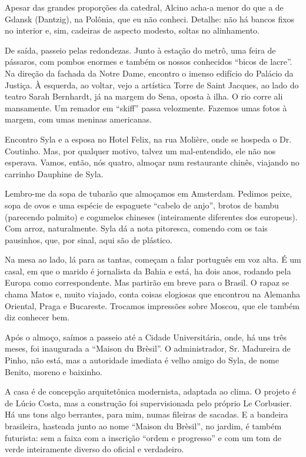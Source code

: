 Apesar das grandes proporções da catedral, Alcino acha-a menor do que a de Gdansk (Dantzig), na Polônia, que eu não conheci. Detalhe: não há bancos fixos no interior e, sim, cadeiras de aspecto modesto, soltas no alinhamento.

De saída, passeio pelas redondezas. Junto à estação do metrô, uma feira de pássaros, com pombos enormes e também os nossos conhecidos ``bicos de lacre''. Na direção da fachada da Notre Dame, encontro o imenso edifício do Palácio da Justiça. À esquerda, ao voltar, vejo a artística Torre de Saint Jacques, ao lado do teatro Sarah Bernhardt, já na margem do Sena, oposta à ilha. O rio corre ali mansamente. Um remador em ``skiff'' passa velozmente. Fazemos umas fotos à margem, com umas meninas americanas.

Encontro Syla e a esposa no Hotel Felix, na rua Molière, onde se hospeda o Dr. Coutinho. Mas, por qualquer motivo, talvez um mal-entendido, ele não nos esperava. Vamos, então, nós quatro, almoçar num restaurante chinês, viajando no carrinho Dauphine de Syla.

Lembro-me da sopa de tubarão que almoçamos em Amsterdam. Pedimos peixe, sopa de ovos e uma espécie de espaguete ``cabelo de anjo'', brotos de bambu (parecendo palmito) e cogumelos chineses (inteiramente diferentes dos europeus). Com arroz, naturalmente. Syla dá a nota pitoresca, comendo com os tais pausinhos, que, por sinal, aqui são de plástico.

Na mesa ao lado, lá para as tantas, começam a falar português em voz alta. É um casal, em que o marido é jornalista da Bahia e está, ha dois anos, rodando pela Europa como correspondente. Mas partirão em breve para o Brasil. O rapaz se chama Matos e, muito viajado, conta coisas elogiosas que encontrou na Alemanha Oriental, Praga e Bucareste. Trocamos impressões sobre Moscou, que ele também diz conhecer bem.

Após o almoço, saímos a passeio até a Cidade Universitária, onde, há uns três meses, foi inaugurada a ``Maison du Brèsil''. O administrador, Sr. Madureira de Pinho, não está, mas a autoridade imediata é velho amigo do Syla, de nome Benito, moreno e baixinho.

A casa é de concepção arquitetônica modernista, adaptada ao clima. O projeto é de Lúcio Costa, mas a construção foi supervisionada pelo próprio Le Corbusier. Há uns tons algo berrantes, para mim, numas fileiras de sacadas. E a bandeira brasileira, hasteada junto ao nome ``Maison du Brèsil'', no jardim, é também futurista: sem a faixa com a inscrição ``ordem e progresso'' e com um tom de verde inteiramente diverso do oficial e verdadeiro.

